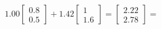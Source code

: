 \documentclass[preview]{standalone}
\begin{document}
\begin{align*}
1.00 \begin{bmatrix} 0.8 \\ 0.5 \end{bmatrix} + 1.42 \begin{bmatrix} 1 \\ 1.6 \end{bmatrix} = \begin{bmatrix} 2.22 \\ 2.78 \end{bmatrix} =
\end{align*}
\end{document}
